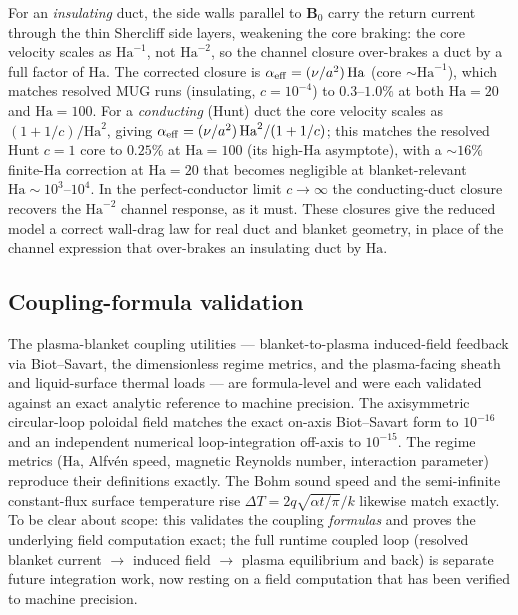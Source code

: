 \documentclass[11pt,letterpaper]{article}
\newcommand{\Ha}{\mathrm{Ha}}
\begin{document}
For an \emph{insulating} duct, the side walls parallel to $\mathbf{B}_0$ carry the
return current through the thin Shercliff side layers, weakening the core braking:
the core velocity scales as $\Ha^{-1}$, not $\Ha^{-2}$, so the channel closure
over-brakes a duct by a full factor of $\Ha$. The corrected closure is
$\alpha_{\rm eff}=(\nu/a^2)\,\Ha$ (core $\sim\Ha^{-1}$), which matches resolved MUG
runs (insulating, $c=10^{-4}$) to $0.3$--$1.0\%$ at both $\Ha=20$ and $\Ha=100$.
For a \emph{conducting} (Hunt) duct the core velocity scales as
$(1+1/c)/\Ha^{2}$, giving $\alpha_{\rm eff}=(\nu/a^2)\,\Ha^{2}/(1+1/c)$; this
matches the resolved Hunt $c=1$ core to $0.25\%$ at $\Ha=100$ (its high-$\Ha$
asymptote), with a $\sim\!16\%$ finite-$\Ha$ correction at $\Ha=20$ that becomes
negligible at blanket-relevant $\Ha\sim10^{3}$--$10^{4}$. In the perfect-conductor
limit $c\!\to\!\infty$ the conducting-duct closure recovers the $\Ha^{-2}$ channel
response, as it must. These closures give the reduced model a correct wall-drag law
for real duct and blanket geometry, in place of the channel expression that
over-brakes an insulating duct by $\Ha$.

\subsection{Coupling-formula validation}
\label{sec:coupling}
The plasma-blanket coupling utilities --- blanket-to-plasma induced-field feedback
via Biot--Savart, the dimensionless regime metrics, and the plasma-facing sheath
and liquid-surface thermal loads --- are formula-level and were each validated
against an exact analytic reference to machine precision. The axisymmetric
circular-loop poloidal field matches the exact on-axis Biot--Savart form to
$10^{-16}$ and an independent numerical loop-integration off-axis to $10^{-15}$.
The regime metrics ($\Ha$, Alfv\'en speed, magnetic Reynolds number, interaction
parameter) reproduce their definitions exactly. The Bohm sound speed and the
semi-infinite constant-flux surface temperature rise
$\Delta T=2q\sqrt{\alpha t/\pi}/k$ likewise match exactly. To be clear about scope:
this validates the coupling \emph{formulas} and proves the underlying field
computation exact; the full runtime coupled loop (resolved blanket current
$\to$ induced field $\to$ plasma equilibrium and back) is separate future
integration work, now resting on a field computation that has been verified to
machine precision.

\end{document}
